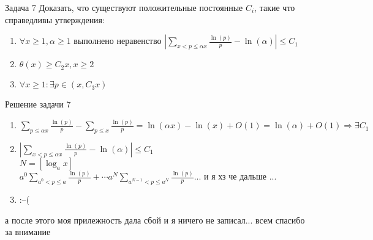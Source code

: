 \documentclass[a4paper,12pt]{article}
\newcommand{\TE}{\theta}
\newcommand{\AL}{\alpha}
\newcommand{\Ra}{\Rightarrow}
\newcommand{\SL}{\sum\limits}
\begin{document}
\begin{mybox}{}
\begin{task}{Задача 7}
Доказать, что существуют положительные постоянные $C_i$, такие что справедливы
утверждения:
\begin{enumerate}
\item $\forall x\ge 1,\AL\ge 1$ выполнено неравенство $\left| \SL_{x < p \le \AL x} \frac{\ln(p)}{p} -\ln(\AL) \right| \le C_1$
\item $\TE(x)\ge C_2x, x\ge 2$
\item $\forall x\ge 1: \exists p\in(x, C_3x)$
\end{enumerate}
\end{task}
\begin{sol}{Решение задачи 7}
\begin{enumerate}
\item $\SL_{p\le\AL x}\frac{\ln(p)}{p} - \SL_{p\le x}\frac{\ln(p)}{p} = \ln(\AL x) - \ln(x) + O(1) =\ln(\AL) + O(1)\Ra \exists C_1 $
\item $\left| \SL_{x < p \le \AL x} \frac{\ln(p)}{p} -\ln(\AL) \right| \le C_1$\\
$N = [\log_ax]$\\
$a^0\SL_{a^0< p\le a}\frac{\ln(p)}{p} + \cdots a^N\SL_{a^{N-1}< p\le a^N}\frac{\ln(p)}{p}$... и я хз че дальше ...
\item :--(
\end{enumerate}
\end{sol}
а после этого моя прилежность дала сбой и я ничего не записал... всем спасибо за внимание
\end{mybox}
\end{document}
